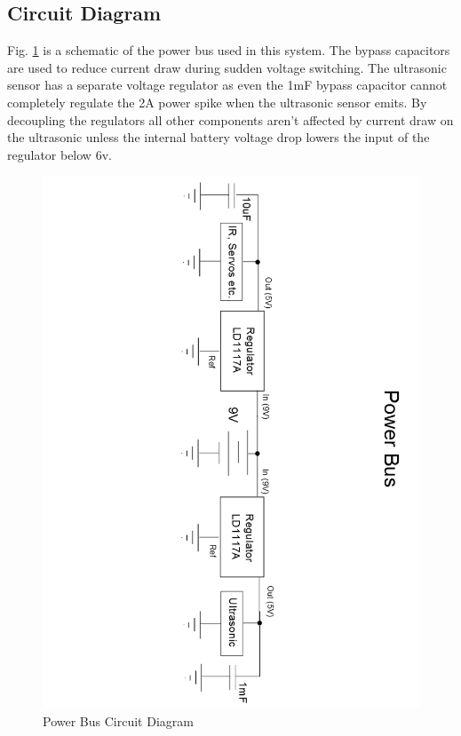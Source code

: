 \documentclass[]{report}
\begin{document}
\subsection{Circuit Diagram}
Fig. \ref{fig:PowerBus} is a schematic of the power bus used in this system. The bypass capacitors are used to reduce current draw during sudden voltage switching. The ultrasonic sensor has a separate voltage regulator as even the 1mF bypass capacitor cannot completely regulate the 2A power spike when the ultrasonic sensor emits. By decoupling the regulators all other components aren't affected by current draw on the ultrasonic unless the internal battery voltage drop lowers the input of the regulator below 6v.
\begin{figure}
\centering
\includegraphics[width=1.2\linewidth]{"../Diagrams/Power Bus Rotated"}
\caption{Power Bus Circuit Diagram}
\label{fig:PowerBus}
\end{figure}
\end{document}
